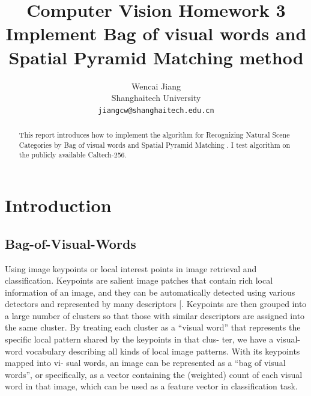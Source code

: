 \documentclass[10pt,twocolumn,letterpaper]{article}
\begin{document}
\title{Computer Vision Homework 3\\Implement Bag of visual words  and Spatial Pyramid Matching  method}

\author{Wencai Jiang\\
Shanghaitech University\\
{\tt\small jiangcw@shanghaitech.edu.cn}
}

\maketitle

\begin{abstract}
   This report introduces how to implement the algorithm for Recognizing Natural Scene Categories by Bag of visual words\cite{YANG2007Evaluating} and Spatial Pyramid Matching \cite{lazebnik2006beyond}. I test algorithm on the publicly available Caltech-256\cite{griffinHolubPerona}.
\end{abstract}

\section{Introduction}
\subsection{Bag-of-Visual-Words}
Using image keypoints or local interest points in image retrieval and classification. Keypoints are salient image patches that contain rich local information of an image, and they can be automatically detected using various detectors  and represented by many descriptors [. Keypoints are then grouped into a large number of clusters so that those with similar descriptors are assigned into the same cluster. By treating each cluster as a “visual word” that represents the specific local pattern shared by the keypoints in that clus- ter, we have a visual-word vocabulary describing all kinds of local image patterns. With its keypoints mapped into vi- sual words, an image can be represented as a “bag of visual words”, or specifically, as a vector containing the (weighted) count of each visual word in that image, which can be used as a feature vector in classification task.
\end{document}
